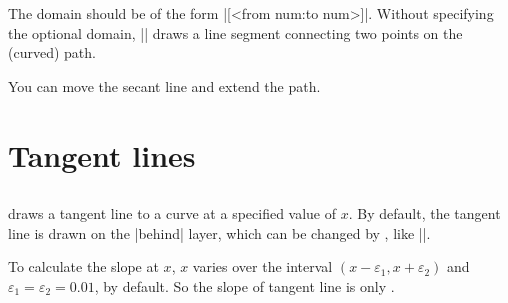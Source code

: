 The domain should be of the form |[<from num:to num>]|.
Without specifying the optional domain, |\tzsecant| draws a line segment connecting two points on the (curved) path.

\begin{tzcode}{.3}
\end{tzcode}

You can move the secant line and extend the path.

\begin{tzcode}{.3}
\end{tzcode}



\section{Tangent lines}
\label{s:tangent}

\subsection{\protect\cmd{\tztangentat}}
\label{ss:tztangentat}

\icmd{\tztangentat} draws a tangent line to a curve at a specified value of $x$.
By default, the tangent line is drawn on the |behind| layer, which can be changed by \icmd{\settztangentlayer}, like ||.

\remark 
To calculate the slope at $x$, $x$ varies over the interval $(x-\varepsilon_1,x+\varepsilon_2)$ and $\varepsilon_1=\varepsilon_2=0.01$, by default.
So the slope of tangent line is only .


